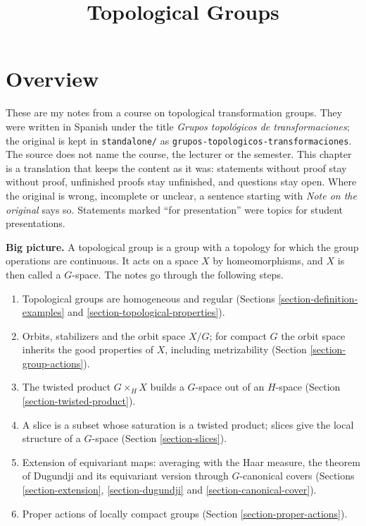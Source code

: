 



\title{Topological Groups}
\maketitle

\label{section-phantom}

\tableofcontents

\section{Overview}
\label{section-overview}

\noindent
These are my notes from a course on
topological transformation groups. They
were written in Spanish under the title
{\it Grupos topol\'ogicos de
transformaciones}; the original is kept
in {\tt standalone/} as
{\tt grupos-topologicos-transformaciones}.
The source does not name the course, the
lecturer or the semester. This chapter is
a translation that keeps the content as
it was: statements without proof stay
without proof, unfinished proofs stay
unfinished, and questions stay open.
Where the original is wrong, incomplete
or unclear, a sentence starting with
{\it Note on the original} says so.
Statements marked ``for presentation''
were topics for student presentations.

\medskip\noindent
{\bf Big picture.} A topological group is
a group with a topology for which the
group operations are continuous. It acts
on a space $X$ by homeomorphisms, and
$X$ is then called a $G$-space. The
notes go through the following steps.
\begin{enumerate}
\item Topological groups are homogeneous
and regular
(Sections
\ref{section-definition-examples} and
\ref{section-topological-properties}).
\item Orbits, stabilizers and the orbit
space $X/G$; for compact $G$ the orbit
space inherits the good properties of
$X$, including metrizability
(Section \ref{section-group-actions}).
\item The twisted product
$G\times_HX$ builds a $G$-space out of
an $H$-space
(Section \ref{section-twisted-product}).
\item A slice is a subset whose
saturation is a twisted product; slices
give the local structure of a $G$-space
(Section \ref{section-slices}).
\item Extension of equivariant maps:
averaging with the Haar measure, the
theorem of Dugundji and its equivariant
version through $G$-canonical covers
(Sections \ref{section-extension},
\ref{section-dugundji} and
\ref{section-canonical-cover}).
\item Proper actions of locally compact
groups
(Section \ref{section-proper-actions}).
\end{enumerate}

